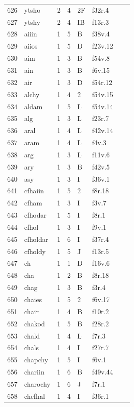 \documentclass[11pt,a4paper]{article}
\begin{document}
\begin{landscape}
\begin{longtable}{@{}r>{\ttfamily}lrrl>{\ttfamily}l>{\raggedright\arraybackslash}p{80mm}>{\raggedright\arraybackslash}p{36mm}@{}}
626 & ytsho & 2 & 4 & 2F & f32r.4 &  & \\
627 & ytshy & 2 & 4 & IB & f13r.3 &  & \\
628 & aiiin & 1 & 5 & B & f38v.4 &  & \\
629 & aiios & 1 & 5 & D & f23v.12 &  & \\
630 & aim & 1 & 3 & B & f54v.8 &  & \\
631 & ain & 1 & 3 & B & f6v.15 &  & \\
632 & air & 1 & 3 & D & f54r.12 &  & \\
633 & alchy & 1 & 4 & 2 & f54v.15 &  & \\
634 & aldam & 1 & 5 & L & f54v.14 &  & \\
635 & alg & 1 & 3 & L & f23r.7 &  & \\
636 & aral & 1 & 4 & L & f42v.14 &  & \\
637 & aram & 1 & 4 & L & f4v.3 &  & \\
638 & arg & 1 & 3 & L & f11v.6 &  & \\
639 & ary & 1 & 3 & B & f42v.5 &  & \\
640 & asy & 1 & 3 & I & f36v.1 &  & \\
641 & cfhaiin & 1 & 5 & 2 & f8r.18 &  & \\
642 & cfham & 1 & 3 & I & f3v.7 &  & \\
643 & cfhodar & 1 & 5 & I & f8r.1 &  & \\
644 & cfhol & 1 & 3 & I & f9v.1 &  & \\
645 & cfholdar & 1 & 6 & I & f37r.4 &  & \\
646 & cfholdy & 1 & 5 & J & f13r.5 &  & \\
647 & ch & 1 & 1 & D & f16v.6 &  & \\
648 & cha & 1 & 2 & B & f8r.18 &  & \\
649 & chag & 1 & 3 & B & f3r.4 &  & \\
650 & chaies & 1 & 5 & 2 & f6v.17 &  & \\
651 & chair & 1 & 4 & B & f10r.2 &  & \\
652 & chakod & 1 & 5 & B & f28r.2 &  & \\
653 & chald & 1 & 4 & L & f7r.3 &  & \\
654 & chals & 1 & 4 & I & f27r.7 &  & \\
655 & chapchy & 1 & 5 & I & f6v.1 &  & \\
656 & chariin & 1 & 6 & B & f49v.44 &  & \\
657 & charochy & 1 & 6 & J & f7r.1 &  & \\
658 & chcfhal & 1 & 4 & I & f36r.1 &  & \\

\end{longtable}
\end{landscape}
\end{document}
